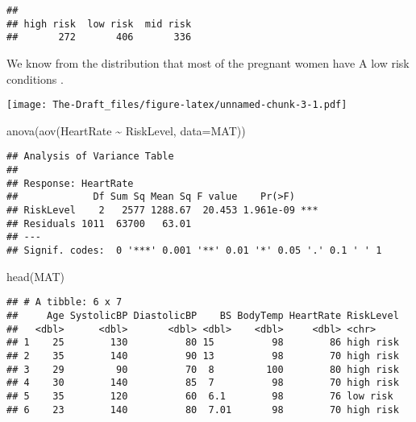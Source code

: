 \documentclass[
]{article}
\newenvironment{Shaded}{\begin{snugshade}}{\end{snugshade}}
\newcommand{\AttributeTok}[1]{\textcolor[rgb]{0.77,0.63,0.00}{#1}}
\newcommand{\FunctionTok}[1]{\textcolor[rgb]{0.00,0.00,0.00}{#1}}
\newcommand{\NormalTok}[1]{#1}
\newcommand{\OtherTok}[1]{\textcolor[rgb]{0.56,0.35,0.01}{#1}}
\newcommand{\SpecialCharTok}[1]{\textcolor[rgb]{0.00,0.00,0.00}{#1}}
\begin{document}
\begin{verbatim}
## 
## high risk  low risk  mid risk 
##       272       406       336
\end{verbatim}

We know from the distribution that most of the pregnant women have A low
risk conditions .

\begin{Shaded}
\end{Shaded}

\texttt{[image: The-Draft\_files/figure-latex/unnamed-chunk-3-1.pdf]}

\begin{Shaded}
\begin{Highlighting}[]
\FunctionTok{anova}\NormalTok{(}\FunctionTok{aov}\NormalTok{(HeartRate }\SpecialCharTok{\textasciitilde{}}\NormalTok{ RiskLevel, }\AttributeTok{data=}\NormalTok{MAT))}
\end{Highlighting}
\end{Shaded}

\begin{verbatim}
## Analysis of Variance Table
## 
## Response: HeartRate
##             Df Sum Sq Mean Sq F value    Pr(>F)    
## RiskLevel    2   2577 1288.67  20.453 1.961e-09 ***
## Residuals 1011  63700   63.01                      
## ---
## Signif. codes:  0 '***' 0.001 '**' 0.01 '*' 0.05 '.' 0.1 ' ' 1
\end{verbatim}

\begin{Shaded}
\begin{Highlighting}[]
\FunctionTok{head}\NormalTok{(MAT)}
\end{Highlighting}
\end{Shaded}

\begin{verbatim}
## # A tibble: 6 x 7
##     Age SystolicBP DiastolicBP    BS BodyTemp HeartRate RiskLevel
##   <dbl>      <dbl>       <dbl> <dbl>    <dbl>     <dbl> <chr>    
## 1    25        130          80 15          98        86 high risk
## 2    35        140          90 13          98        70 high risk
## 3    29         90          70  8         100        80 high risk
## 4    30        140          85  7          98        70 high risk
## 5    35        120          60  6.1        98        76 low risk 
## 6    23        140          80  7.01       98        70 high risk
\end{verbatim}
\end{document}
